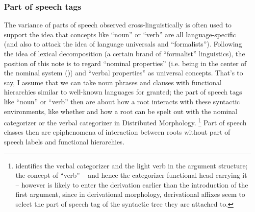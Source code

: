 \documentclass[UTF8, a4paper, oneside, scheme=plain, 12pt]{ctexbook}
\newcommand*{\citechap}[1]{Ch.~{#1}}
\begin{document}
{\subsubsection{Part of speech tags}\label{sec:theory.pos}

The variance of parts of speech observed cross-linguistically
is often used to support the idea that 
concepts like ``noun'' or ``verb'' 
are all language-specific
(and also to attack the idea of language universals and ``formalists'').
Following the idea of lexical decomposition (a certain brand of ``formalist'' linguistics),
the position of this note is to regard ``nominal properties''
(i.e. being in the center of the nominal system ())
and ``verbal properties''
as universal concepts.
That's to say, I assume that we can take noun phrases and clauses
with functional hierarchies similar to well-known languages 
for granted;
the part of speech tags like ``noun'' or ``verb''
then are about how a root interacts with these syntactic environments,
like whether and how a root can be spelt out 
with the nominal categorizer or the verbal categorizer in Distributed Morphology.%
\footnote{
    \citet[\citechap{10}]{siddiqi2009syntax} identifies 
    the verbal categorizer and the light verb in the argument structure; 
    the concept of ``verb'' -- and hence the categorizer functional head carrying it --  
    however is likely to enter the derivation 
    earlier than the introduction of the first argument, 
    since in derivational morphology, 
    derivational affixes seem to select the part of speech tag 
    of the syntactic tree they are attached to.
}
Part of speech classes then are epiphenomena 
of interaction between roots without part of speech labels  
and functional hierarchies.

}
\end{document}
